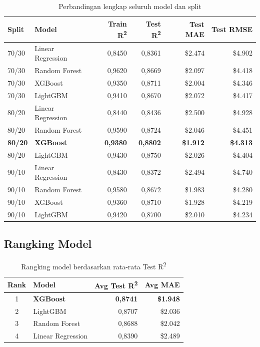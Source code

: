 \documentclass[12pt,a4paper]{article}
\begin{document}
\begin{table}[h!]
\centering
\caption{Perbandingan lengkap seluruh model dan split}
\small
\begin{tabular}{llrrrr}
\toprule
\textbf{Split} & \textbf{Model} & \textbf{Train R\textsuperscript{2}} & \textbf{Test R\textsuperscript{2}} & \textbf{Test MAE} & \textbf{Test RMSE} \\
\midrule
70/30 & Linear Regression & 0,8450 & 0,8361 & \$2.474 & \$4.902 \\
70/30 & Random Forest     & 0,9620 & 0,8669 & \$2.097 & \$4.418 \\
70/30 & XGBoost           & 0,9350 & 0,8711 & \$2.004 & \$4.346 \\
70/30 & LightGBM          & 0,9410 & 0,8670 & \$2.072 & \$4.417 \\
\midrule
80/20 & Linear Regression & 0,8440 & 0,8436 & \$2.500 & \$4.928 \\
80/20 & Random Forest     & 0,9590 & 0,8724 & \$2.046 & \$4.451 \\
\textbf{80/20} & \textbf{XGBoost} & \textbf{0,9380} & \textbf{0,8802} & \textbf{\$1.912} & \textbf{\$4.313} \\
80/20 & LightGBM          & 0,9430 & 0,8750 & \$2.026 & \$4.404 \\
\midrule
90/10 & Linear Regression & 0,8430 & 0,8372 & \$2.494 & \$4.740 \\
90/10 & Random Forest     & 0,9580 & 0,8672 & \$1.983 & \$4.280 \\
90/10 & XGBoost           & 0,9360 & 0,8710 & \$1.928 & \$4.219 \\
90/10 & LightGBM          & 0,9420 & 0,8700 & \$2.010 & \$4.234 \\
\bottomrule
\end{tabular}
\end{table}

\subsection{Rangking Model}

\begin{table}[h!]
\centering
\caption{Rangking model berdasarkan rata-rata Test R\textsuperscript{2}}
\begin{tabular}{clrr}
\toprule
\textbf{Rank} & \textbf{Model} & \textbf{Avg Test R\textsuperscript{2}} & \textbf{Avg MAE} \\
\midrule
1 & \textbf{XGBoost}      & \textbf{0,8741} & \textbf{\$1.948} \\
2 & LightGBM              & 0,8707          & \$2.036 \\
3 & Random Forest          & 0,8688          & \$2.042 \\
4 & Linear Regression      & 0,8390          & \$2.489 \\
\bottomrule
\end{tabular}
\end{table}
\end{document}
